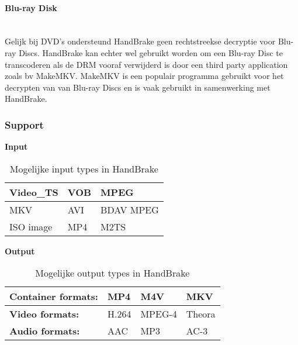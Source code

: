 \paragraph{Blu-ray Disk}  
\ \\[12pt]

Gelijk bij DVD's ondersteund HandBrake geen rechtstreekse decryptie voor Blu-ray Discs. HandBrake kan echter wel gebruikt worden om een Blu-ray Disc te transcoderen als de DRM vooraf verwijderd is door een third party application zoals bv MakeMKV. MakeMKV is een populair programma gebruikt voor het decrypten van van Blu-ray Discs en is vaak gebruikt in samenwerking met HandBrake.

\subsubsection{Support}

\begin{table}[!h]
\textbf{Input}\\
\centering
\begin{tabular}{ | l | l | l | }
\hline
Video\_TS & VOB & MPEG \\ \hline
MKV & AVI & BDAV MPEG\-2 \\ \hline
ISO image & MP4 & M2TS \\
\hline
\end{tabular}
\caption{Mogelijke input types in HandBrake}
\label{tab:input}
\end{table}

\begin{table}[!h]
\textbf{Output}\\
\centering
\begin{tabular}{ | l | l | l | l | }
\hline
\textbf{Container formats:} & MP4 & M4V & MKV \\ \hline
\textbf{Video formats:} & H.264 & MPEG-4 & Theora \\ \hline
\textbf{Audio formats:} & AAC & MP3 & AC-3 \\
\hline
\end{tabular}
\caption{Mogelijke output types in HandBrake}
\label{tab:output}
\end{table}

\pagebreak